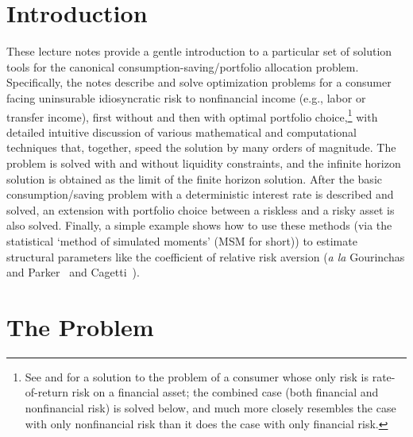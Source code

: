\documentclass[titlepage, headings=optiontotocandhead]{econtex}
\begin{document}
\titlepagefinish

\thispagestyle{empty} %
\ifpdf %
\tableofcontents {}\newpage
\fi
\newpage{} %

\thispagestyle{empty} %
\hypertarget{introduction}{}
\section{Introduction}\label{sec:introduction}

  These lecture notes provide a gentle introduction to a particular set of solution tools for the canonical consumption-saving/portfolio allocation problem.  Specifically, the notes describe and solve optimization problems for a consumer facing uninsurable idiosyncratic risk to nonfinancial income (e.g., labor or transfer income), first without and then with optimal portfolio choice,\footnote{See \cite{merton:restat} and \cite{samuelson:portfolio} for a solution to the problem of a consumer whose only risk is rate-of-return risk on a financial asset; the combined case (both financial and nonfinancial risk) is solved below, and much more closely resembles the case with only nonfinancial risk than it does the case with only financial risk.} with detailed intuitive discussion of various mathematical and computational techniques that, together, speed the solution by many orders of magnitude.  The problem is solved with and without liquidity constraints, and the infinite horizon solution is obtained as the limit of the finite horizon solution.  After the basic consumption/saving problem with a deterministic interest rate is described and solved, an extension with portfolio choice between a riskless and a risky asset is also solved.  Finally, a simple example shows how to use these methods (via the statistical `method of simulated moments' (MSM for short)) to estimate structural parameters like the coefficient of relative risk aversion (\textit{a la} Gourinchas and Parker~\citeyearpar{gpLifecycle} and Cagetti~\citeyearpar{cagettiWprofiles}).


\hypertarget{the-problem}{}
\section{The Problem}\label{sec:the-problem}
\end{document}
